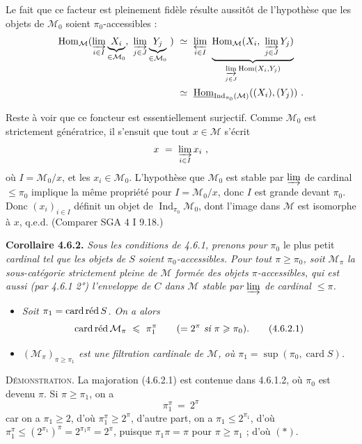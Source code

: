 \documentclass[11pt]{article}
\newcommand{\printedpage}[1]{\marginpar{\footnotesize p.~#1}}
\newcommand{\msp}[1]{\marginpar{\footnotesize [#1]}}
\newcommand{\Ind}{\operatorname{Ind}}
\newcommand{\cardred}{\mathop{\mathrm{card}\,\textup{réd}}\nolimits}
\begin{document}
Le fait que ce facteur est pleinement fidèle résulte aussitôt de l'hypothèse que les objets de $\mathcal{M}_0$ soient $\pi_0$-accessibles : %
\[
\begin{aligned}
\operatorname{Hom}_{\mathcal{M}}(\varinjlim_{i\in I}\underbrace{X_i}_{\in\mathcal{M}_0},\ \varinjlim_{j\in J}\underbrace{Y_j}_{\in\mathcal{M}_0}\ ) &\ \simeq\ \varprojlim_{i\in I}\ \underbrace{\operatorname{Hom}_{\mathcal{M}}(X_i,\ \varinjlim_{j\in J}Y_j)}_{\varinjlim\limits_{j\in J}\operatorname{Hom}(X_i,Y_j)}\\
&\ \simeq\ \underline{\operatorname{Hom}}_{\Ind_{\pi_0}(\mathcal{M})}((X_i),(Y_j))\ .
\end{aligned}
\]

\msp{page 145}

Reste à voir que ce foncteur est essentiellement surjectif. Comme $\mathcal{M}_0$ est strictement génératrice, il s'ensuit que tout $x\in\mathcal{M}$ s'écrit
\[
x \ =\ \varinjlim_{i\in I}x_i\ ,
\]
où $I=\mathcal{M}_0/x$, et les $x_i\in\mathcal{M}_0$. L'hypothèse que $\mathcal{M}_0$ est stable par $\varinjlim$ de cardinal $\leqslant\pi_0$ implique la même propriété pour $I=\mathcal{M}_0/x$, donc $I$ est grande devant $\pi_0$. Donc $(x_i)_{i\in I}$ définit un objet de $\Ind_{\pi_0}\mathcal{M}_0$, dont l'image dans $\mathcal{M}$ est isomorphe à $x$, q.e.d. (Comparer SGA 4 I 9.18.)

\textbf{Corollaire 4.6.2.} \textit{Sous les conditions de 4.6.1, prenons pour $\pi_0$} le plus petit \textit{cardinal tel que les objets de $S$ soient $\pi_0$-accessibles. Pour tout $\pi\geqslant\pi_0$, soit $\mathcal{M}_\pi$ la sous-catégorie strictement pleine de $\mathcal{M}$ formée des objets $\pi$-accessibles, qui est aussi (par 4.6.1 2°) l'enveloppe de $C$ dans $\mathcal{M}$ stable par $\varinjlim$ de cardinal $\leqslant\pi$.}
\begin{itemize}[leftmargin=2.5em]
\item[\textit{1°)}] \textit{Soit $\pi_1=\cardred S$. On a alors}
\[
\cardred\mathcal{M}_\pi \ \leqslant\ \pi_1^{\pi} \qquad (=2^{\pi}\ \textit{si}\ \pi\geqslant\pi_0). \tag*{(4.6.2.1)}
\]
\printedpage{47}
\msp{page 146}
\item[\textit{2°)}] \textit{$(\mathcal{M}_\pi)_{\pi\geqslant\pi_1}$ est une filtration cardinale de $\mathcal{M}$, où $\pi_1=\sup(\pi_0,\operatorname{card}S)$.}
\end{itemize}

\textsc{Démonstration}. La majoration (4.6.2.1) est contenue dans 4.6.1.2, où $\pi_0$ est devenu $\pi$. Si $\pi\geqslant\pi_1$, on a
\[
\pi_1^{\pi} \ =\ 2^{\pi} \tag*{$(*)$}
\]
car on a $\pi_1\geqslant2$, d'où $\pi_1^{\pi}\geqslant2^{\pi}$, d'autre part, on a $\pi_1\leqslant2^{\pi_1}$, d'où $\pi_1^{\pi}\leqslant(2^{\pi_1})^{\pi}=2^{\pi_1\pi}=2^{\pi}$, puisque $\pi_1\pi=\pi$ pour $\pi\geqslant\pi_1$ ; d'où $(*)$.
\end{document}
